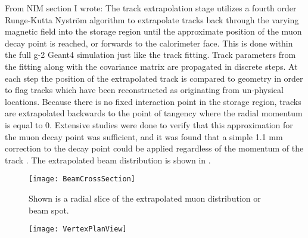 From NIM section I wrote:
The track extrapolation stage utilizes a fourth order Runge-Kutta Nystr\"{o}m algorithm \cite{SCThesis} to extrapolate tracks back through the varying magnetic field into the storage region until the approximate position of the muon decay point is reached, or forwards to the calorimeter face. This is done within the full g-2 Geant4 simulation just like the track fitting. Track parameters from the fitting along with the covariance matrix are propagated in discrete steps. At each step the position of the extrapolated track is compared to geometry in order to flag tracks which have been reconstructed as originating from un-physical locations. Because there is no fixed interaction point in the storage region, tracks are extrapolated backwards to the point of tangency where the radial momentum is equal to 0. Extensive studies were done to verify that this approximation for the muon decay point was sufficient, and it was found that a simple 1.1 mm correction to the decay point could be applied regardless of the momentum of the track \cite{SCThesis}. The extrapolated beam distribution is shown in .


\begin{figure}[]
  \centering
  \texttt{[image: BeamCrossSection]}
    \caption[Extrapolated muon beam distribution cross-section]{Shown is a radial slice of the extrapolated muon distribution or beam spot.}
    \label{fig:BeamCrossSection}
\end{figure}



\begin{figure}[]
	\centering
	\texttt{[image: VertexPlanView]}
    \caption[Birds eye view of extrapolation in ring]{}    
    \label{fig:VertexPlanView}
\end{figure}



